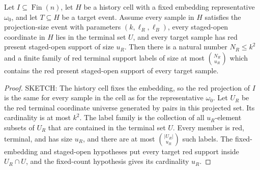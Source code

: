 \begin{helper}
Let \(I\subseteq \operatorname{Fin}(n)\), let \(H\) be a history cell with a
fixed embedding representative \(\omega_0\), and let \(T\subseteq H\) be a
target event.  Assume every sample in \(H\) satisfies the projection-size
event with parameters \((k,\ell_R,\ell_B)\), every staged-open coordinate in
\(H\) lies in the terminal set \(U\), and every target sample has red present
staged-open support of size \(u_R\).  Then there is a natural number
\(N_R\le k^2\) and a finite family of red terminal support labels of size at
most \(\binom{N_R}{u_R}\) which contains the red present staged-open support
of every target sample.
\end{helper}
\begin{proof}
SKETCH:
The history cell fixes the embedding, so the red projection of \(I\) is the
same for every sample in the cell as for the representative \(\omega_0\).
Let \(U_R\) be the red terminal coordinate universe generated by pairs in
this projected set.  Its cardinality is at most \(k^2\).  The label family is
the collection of all \(u_R\)-element subsets of \(U_R\) that are contained
in the terminal set \(U\).  Every member is red, terminal, and has size
\(u_R\), and there are at most \(\binom{|U_R|}{u_R}\) such labels.  The
fixed-embedding and staged-open hypotheses put every target red support
inside \(U_R\cap U\), and the fixed-count hypothesis gives its cardinality
\(u_R\).
\end{proof}
